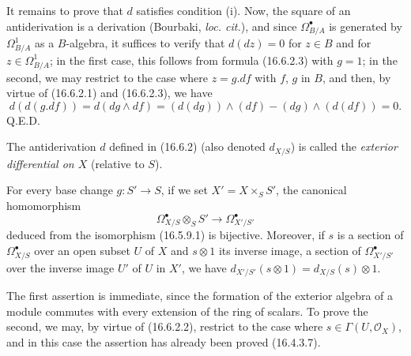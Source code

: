 It remains to prove that $d$ satisfies condition (i). Now, the square of an
antiderivation is a derivation (Bourbaki, \emph{loc. cit.}), and since
$\Omega_{B/A}^{\bullet}$ is generated by $\Omega_{B/A}^1$ as a
$B$-algebra, it suffices to verify that $d(dz)=0$ for $z\in B$ and for
$z\in\Omega_{B/A}^1$; in the first case, this follows from formula
(16.6.2.3) with $g=1$; in the second, we may restrict to the case where $z=g.df$
with $f$, $g$ in $B$, and then, by virtue of (16.6.2.1) and (16.6.2.3), we have
\[
  d(d(g.df))=d(dg\wedge df)
  =(d(dg))\wedge(df)-(dg)\wedge(d(df))=0.
\]
\hfill Q.E.D.

\begin{definition}[16.6.3]\label{IV.16.6.3}
The antiderivation $d$ defined in (16.6.2) (also denoted $d_{X/S}$) is
called the \emph{exterior differential on $X$} (relative to $S$).
\end{definition}

\begin{proposition}[16.6.4]
\label{IV.16.6.4}
For every base change $g:S'\to S$, if we set
$X'=X\times_S S'$, the canonical homomorphism
\[
  \Omega_{X/S}^{\bullet}\otimes_S S'
  \longrightarrow\Omega_{X'/S'}^{\bullet}
  \tag{16.6.4.1}
  \label{IV.16.6.4.1}
\]
deduced from the isomorphism (16.5.9.1) is bijective. Moreover, if $s$ is a
section of $\Omega_{X/S}^{\bullet}$ over an open subset $U$ of $X$ and
$s\otimes1$ its inverse image, a section of $\Omega_{X'/S'}^{\bullet}$
over the inverse image $U'$ of $U$ in $X'$, we have
$d_{X'/S'}(s\otimes1)=d_{X/S}(s)\otimes1$.
\end{proposition}

The first assertion is immediate, since the formation of the exterior algebra
of a module commutes with every extension of the ring of scalars. To
prove the second, we may, by virtue of (16.6.2.2), restrict to the case where
$s\in\Gamma(U,\mathcal{O}_X)$, and in this case the assertion has already been
proved (16.4.3.7).

